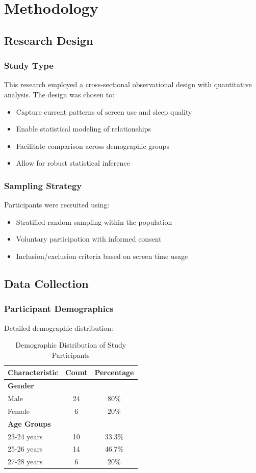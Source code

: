 \documentclass[conference]{IEEEtran}
\begin{document}
\section{Methodology}
\subsection{Research Design}
\subsubsection{Study Type}
This research employed a cross-sectional observational design with quantitative analysis. The design was chosen to:
\begin{itemize}
\item Capture current patterns of screen use and sleep quality
\item Enable statistical modeling of relationships
\item Facilitate comparison across demographic groups
\item Allow for robust statistical inference
\end{itemize}

\subsubsection{Sampling Strategy}
Participants were recruited using:
\begin{itemize}
\item Stratified random sampling within the population
\item Voluntary participation with informed consent
\item Inclusion/exclusion criteria based on screen time usage
\end{itemize}

\subsection{Data Collection}
\subsubsection{Participant Demographics}
Detailed demographic distribution:
\begin{table}[htbp]
\begin{center}
\begin{tabular}{|l|c|c|}
\hline
\textbf{Characteristic} & \textbf{Count} & \textbf{Percentage} \\
\hline
\multicolumn{3}{|l|}{\textbf{Gender}} \\
Male & 24 & 80\% \\
Female & 6 & 20\% \\
\hline
\multicolumn{3}{|l|}{\textbf{Age Groups}} \\
23-24 years & 10 & 33.3\% \\
25-26 years & 14 & 46.7\% \\
27-28 years & 6 & 20\% \\
\hline
\end{tabular}
\end{center}
\caption{Demographic Distribution of Study Participants}
\end{table}
\end{document}
